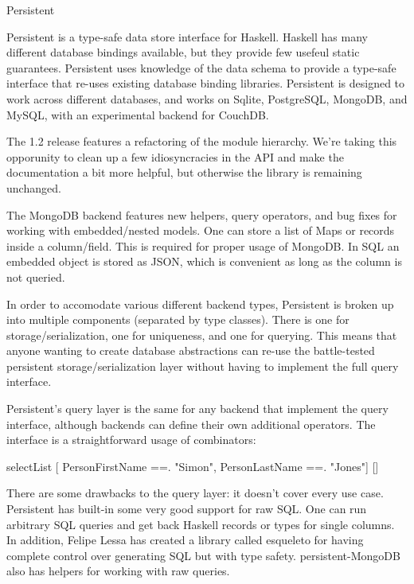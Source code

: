 \begin{hcarentry}{Persistent} 
\label{persistent}
\makeheader

Persistent is a type-safe data store interface for Haskell.
Haskell has many different database bindings available, but they provide few usefeul static guarantees.
Persistent uses knowledge of the data schema to provide a type-safe interface that re-uses existing database binding libraries. Persistent is designed to work across different databases, and works on Sqlite, PostgreSQL, MongoDB, and MySQL, with an experimental backend for CouchDB.

The 1.2 release features a refactoring of the module hierarchy. We're taking this opporunity to clean up a few idiosyncracies in the API and make the documentation a bit more helpful, but otherwise the library is remaining unchanged.

The MongoDB backend features new helpers, query operators, and bug fixes for working with embedded/nested models. One can store a list of Maps or records inside a column/field. This is required for proper usage of MongoDB. In SQL an embedded object is stored as JSON, which is convenient as long as the column is not queried.

In order to accomodate various different backend types, Persistent is broken up into multiple components (separated by type classes). There is one for storage/serialization, one for uniqueness, and one for querying. This means that anyone wanting to create database abstractions can re-use the battle-tested persistent storage/serialization layer without having to implement the full query interface.

Persistent's query layer is the same for any backend that implement the query interface, although backends can define their own additional operators. The interface is a straightforward usage of combinators:

\begin{code}
selectList [  PersonFirstName ==. "Simon", 
              PersonLastName ==. "Jones"] []
\end{code}

There are some drawbacks to the query layer: it doesn't cover every use case. Persistent has built-in some very good support for raw SQL. One can run arbitrary SQL queries and get back Haskell records or types for single columns. In addition, Felipe Lessa has created a library called esqueleto for having complete control over generating SQL but with type safety. persistent-MongoDB also has helpers for working with raw queries.


\end{hcarentry}
